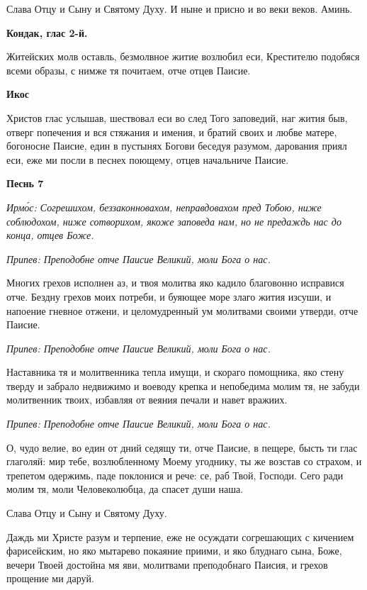 Слава Отцу и Сыну и Святому Духу. И ныне и присно и во веки веков. Аминь.





\bfseries Кондак, глас 2-й.\normalfont{}


Житейских молв оставль, безмолвное житие возлюбил еси, Крестителю подобяся всеми образы, с нимже тя почитаем, отче отцев Паисие.





\bfseries Икос\normalfont{}


Христов глас услышав, шествовал еси во след Того заповедий, наг жития быв, отверг попечения и вся стяжания и имения, и братий своих и любве матере, богоносне Паисие, един в пустынях Богови беседуя разумом, дарования приял еси, еже ми посли в песнех поющему, отцев начальниче Паисие.





\bfseries Песнь 7\normalfont{}


\itshape Ирмо́с:\normalfont{} Согрешихом, беззаконновахом, неправдовахом пред Тобою, ниже соблюдохом, ниже сотворихом, якоже заповеда нам, но не предаждь нас до конца, отцев Боже.


\itshape Припев:\normalfont{} Преподобне отче Паисие Великий, моли Бога о нас.


Многих грехов исполнен аз, и твоя молитва яко кадило благовонно исправися отче. Бездну грехов моих потреби, и буяющее море злаго жития изсуши, и напоение гневное отжени, и целомудренный ум молитвами своими утверди, отче Паисие.


\itshape Припев:\normalfont{} Преподобне отче Паисие Великий, моли Бога о нас.


Наставника тя и молитвенника тепла имущи, и скораго помощника, яко стену тверду и забрало недвижимо и воеводу крепка и непобедима молим тя, не забуди молитвенник твоих, избавляя от веяния печали и навет вражиих.


\itshape Припев:\normalfont{} Преподобне отче Паисие Великий, моли Бога о нас.


О, чудо велие, во един от дний седящу ти, отче Паисие, в пещере, бысть ти глас глаголяй: мир тебе, возлюбленному Моему угоднику, ты же возстав со страхом, и трепетом одержимь, паде поклонися и рече: се, раб Твой, Господи. Сего ради молим тя, моли Человеколюбца, да спасет души наша.


Слава Отцу и Сыну и Святому Духу.


Даждь ми Христе разум и терпение, еже не осуждати согрешающих с кичением фарисейским, но яко мытарево покаяние приими, и яко блуднаго сына, Боже, вечери Твоей достойна мя яви, молитвами преподобнаго Паисия, и грехов прощение ми даруй.


